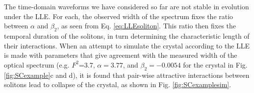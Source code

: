 
The time-domain waveforms we have considered so far are not stable in evolution under the LLE. For each, the observed width of the spectrum fixes the ratio between $\alpha$ and $\beta_2$, as seen from Eq. \ref{eq:LLEsoliton}. This ratio then fixes the temporal duration of the solitons, in turn determining the characteristic length of their interactions. When an attempt to simulate the crystal according to the LLE is made with parameters that give agreement with the measured width of the optical spectrum (e.g. $F^2$=3.7, $\alpha=3.77$, and $\beta_2=-0.0054$ for the crystal in Fig. \ref{fig:SCexample}c and d), it is found that pair-wise attractive interactions between solitons lead to collapse of the crystal, as shown in Fig. \ref{fig:SCexamplesim}.

